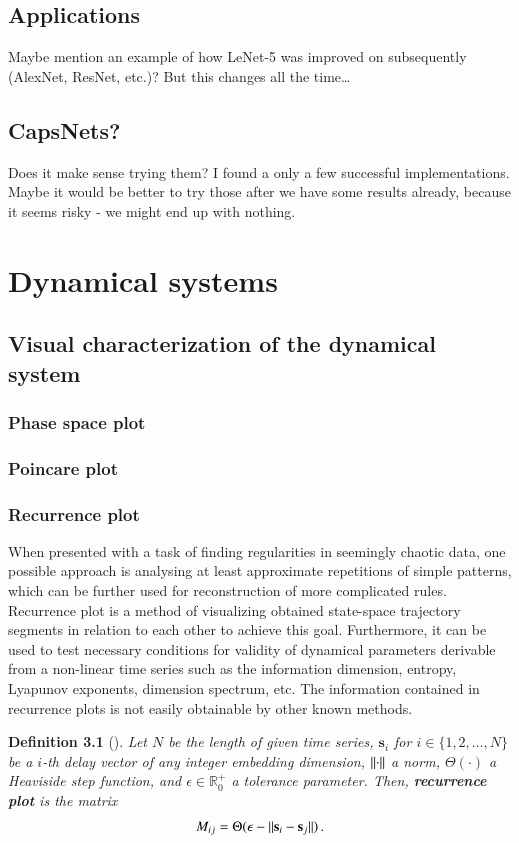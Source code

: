 \documentclass[11pt,czech,american,dvipsnames]{book}
\newtheorem{dfn}{Definition}
\newcommand{\RR}{\mathbb{R}}
\DeclarePairedDelimiter\norm{\lVert}{\rVert}
\begin{document}
\section{Applications}
Maybe mention an example of how LeNet-5 was improved on subsequently (AlexNet, ResNet, etc.)? But this changes all the time\dots

\section{CapsNets?} \label{sec:capsnets}
Does it make sense trying them? I found a only a few successful implementations. Maybe it would be better to try those after we have some results already, because it seems risky - we might end up with nothing.

\chapter{Dynamical systems}
\section{Visual characterization of the dynamical system}
\subsection{Phase space plot}
\subsection{Poincare plot}
\subsection{Recurrence plot}
When presented with a task of finding regularities in seemingly chaotic data, one possible approach is analysing at least approximate repetitions of simple patterns, which can be further used for reconstruction of more complicated rules. Recurrence plot is a method of visualizing obtained state-space trajectory segments in relation to each other to achieve this goal. Furthermore, it can be used to test necessary conditions for validity of dynamical parameters derivable from a non-linear time series such as the information dimension, entropy, Lyapunov exponents, dimension spectrum, etc. The information contained in recurrence plots is not easily obtainable by other known methods. \cite{eckmann1987}

\begin{dfn}[\cite{eckmann1987}]
  Let $N$ be the length of given time series, $\mathbf{s}_i$ for $i \in \{1,2,\dots,N \}$ be a $i$-th delay vector of any integer embedding dimension, $\norm{\cdot}$ a norm, $\Theta(\cdot)$ a Heaviside step function, and $\epsilon \in \RR_0^+$ a tolerance parameter. Then, \textbf{recurrence plot} is the matrix
  \begin{align}
    M_{ij} = \Theta(\epsilon - \norm{ \textbf{s}_i - \textbf{s}_j }) \, .
  \end{align}
\end{dfn}
\end{document}
